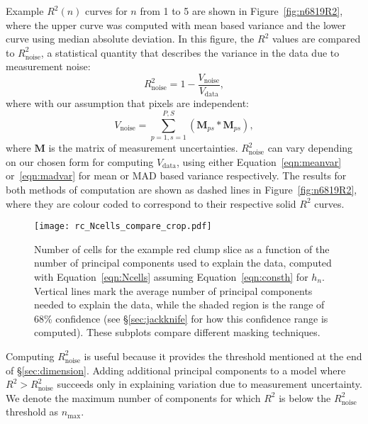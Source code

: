 \documentclass[a4paper,fleqn,usenatbib]{mnras}
\newcommand       \Rsq      {{R^2}}
\newcommand       \Rnoise   {{R^2_{\mathrm{noise}}}}
\begin{document}
Example $R^2(n)$ curves for $n$ from 1 to 5 are shown in Figure~\ref{fig:n6819R2}, where the upper curve was computed with mean based variance and the lower curve using median absolute deviation. In this figure, the $\Rsq$ values are compared to $\Rnoise$, a statistical quantity that describes the variance in the data due to measurement noise:
%
\begin{equation}
\label{eqn:Rnoise}
\Rnoise = 1 - \frac{V_{\mathrm{noise}}}{V_{\mathrm{data}}},
\end{equation}
where with our assumption that pixels are independent:
\begin{equation}
V_{\mathrm{noise}} = \sum_{p=1,s=1}^{P,S} \left(\mathbf{M}_{ps} * \mathbf{M}_{ps}\right),
\end{equation}
where $\mathbf{M}$ is the matrix of measurement uncertainties. $\Rnoise$ can vary depending on our chosen form for computing $V_{\mathrm{data}}$, using either Equation~\eqref{eqn:meanvar} or~\eqref{eqn:madvar} for mean or MAD based variance respectively. The results for both methods of computation are shown as dashed lines in Figure~\ref{fig:n6819R2}, where they are colour coded to correspond to their respective solid $R^2$ curves. 


\begin{figure*}
\centering
\texttt{[image: rc\_Ncells\_compare\_crop.pdf]}
\caption{Number of cells for the example red clump slice as a function of the number of principal components used to explain the data, computed with Equation~\eqref{eqn:Ncells} assuming Equation~\eqref{eqn:consth} for $h_n$. Vertical lines mark the average number of principal components needed to explain the data, while the shaded region is the range of 68\% confidence (see \S\ref{sec:jackknife} for how this confidence range is computed). These subplots compare different masking techniques.}
\label{fig:rcNcell}
\end{figure*}


Computing $\Rnoise$ is useful because it provides the threshold mentioned at the end of \S\ref{sec:dimension}. Adding additional principal components to a model where $\Rsq > \Rnoise$ succeeds only in explaining variation due to measurement uncertainty. We denote the maximum number of components for which $\Rsq$ is below the $\Rnoise$ threshold as $n_{\max}$.


\end{document}
